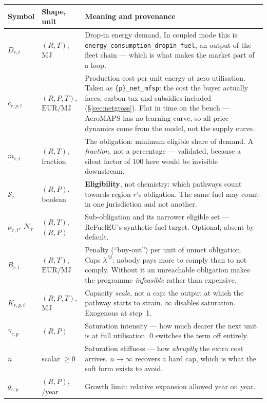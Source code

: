 \documentclass[11pt,a4paper]{article}
\newcommand{\var}[1]{\texttt{\small #1}}
\newcommand{\EURMJ}{\ensuremath{\mathrm{EUR}/\mathrm{MJ}}}
\begin{document}
\begin{table}[h]
\centering\small
\begin{tabular}{@{}llp{8.3cm}@{}}
\toprule
\textbf{Symbol} & \textbf{Shape, unit} & \textbf{Meaning and provenance} \\
\midrule
$D_{r,t}$ & $(R,T)$, MJ & Drop-in energy demand. In coupled mode this is
  \var{energy\_consumption\_dropin\_fuel}, an output of the fleet chain --- which is
  what makes the market part of a loop. \\
$c_{r,p,t}$ & $(R,P,T)$, \EURMJ & Production cost per unit energy at zero utilisation.
  Taken as \var{\{p\}\_net\_mfsp}: the cost the buyer actually faces, carbon tax and
  subsidies included (\S\ref{sec:netgross}). Flat in time on the bench --- AeroMAPS has
  no learning curve, so all price dynamics come from the model, not the supply curve. \\
$m_{r,t}$ & $(R,T)$, fraction & The obligation: minimum eligible share of demand. A
  \emph{fraction}, not a percentage --- validated, because a silent factor of 100 here
  would be invisible downstream. \\
$\mathcal{S}_r$ & $(R,P)$, boolean & \textbf{Eligibility}, not chemistry: which pathways
  count towards region $r$'s obligation. The same fuel may count in one jurisdiction and
  not another. \\
$\mu_{r,t},\ \mathcal{N}_r$ & $(R,T)$, $(R,P)$ & Sub-obligation and its narrower
  eligible set --- ReFuelEU's synthetic-fuel target. Optional; absent by default. \\
$B_{r,t}$ & $(R,T)$, \EURMJ & Penalty (``buy-out'') per unit of unmet obligation. Caps
  $\lambda^{M}$: nobody pays more to comply than to not comply. Without it an
  unreachable obligation makes the programme \emph{infeasible} rather than expensive. \\
$K_{r,p,t}$ & $(R,P,T)$, MJ & Capacity \emph{scale}, not a cap: the output at which the
  pathway starts to strain. $\infty$ disables saturation. Exogenous at step~1. \\
$\gamma_{r,p}$ & $(R,P)$ & Saturation intensity --- how much dearer the next unit is at
  full utilisation. $0$ switches the term off entirely. \\
$n$ & scalar $\ge 0$ & Saturation stiffness --- how \emph{abruptly} the extra cost
  arrives. $n \to \infty$ recovers a hard cap, which is what the soft form exists to
  avoid. \\
$g_{r,p}$ & $(R,P)$, /year & Growth limit: relative expansion allowed year on year. \\

\end{tabular}
\end{table}
\end{document}
